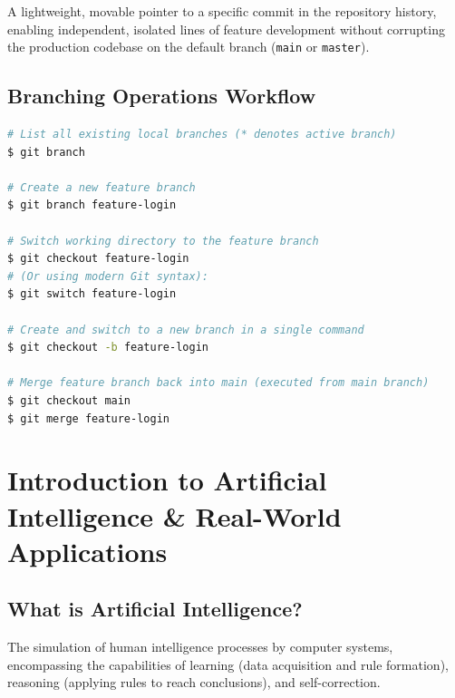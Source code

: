 \begin{definition}
A lightweight, movable pointer to a specific commit in the repository history, enabling independent, isolated lines of feature development without corrupting the production codebase on the default branch (\texttt{main} or \texttt{master}).
\end{definition}

\subsection{Branching Operations Workflow}

\begin{lstlisting}[language=bash]
# List all existing local branches (* denotes active branch)
$ git branch

# Create a new feature branch
$ git branch feature-login

# Switch working directory to the feature branch
$ git checkout feature-login
# (Or using modern Git syntax):
$ git switch feature-login

# Create and switch to a new branch in a single command
$ git checkout -b feature-login

# Merge feature branch back into main (executed from main branch)
$ git checkout main
$ git merge feature-login
\end{lstlisting}

\section{Introduction to Artificial Intelligence \& Real-World Applications}

\subsection{What is Artificial Intelligence?}

\begin{definition}
The simulation of human intelligence processes by computer systems, encompassing the capabilities of learning (data acquisition and rule formation), reasoning (applying rules to reach conclusions), and self-correction.
\end{definition}

